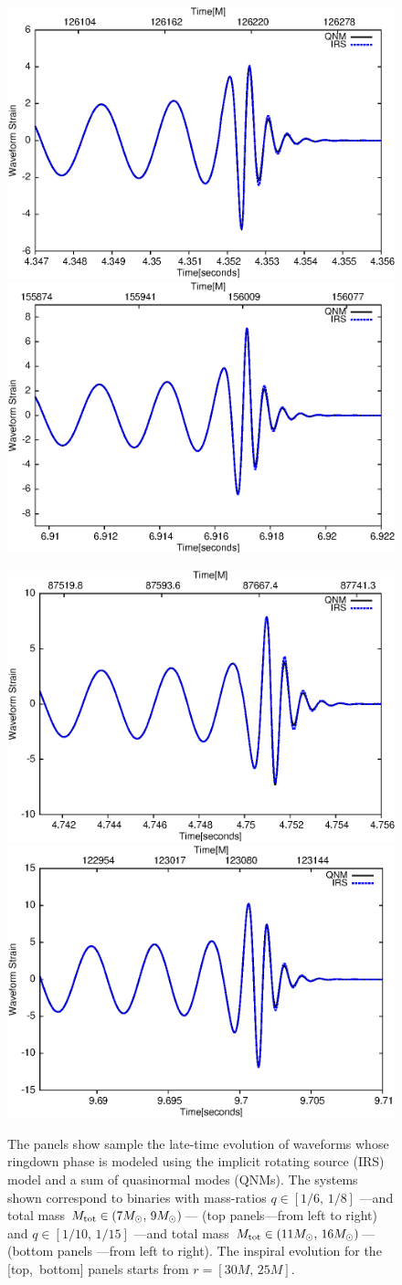 \documentclass[aps,prd,showpacs,amssymb,floatfix,nofootinbib,superscriptaddress]{revtex4-1}%
\begin{document}
\begin{figure}[ht]
\centerline{
\includegraphics[height=0.35\textwidth,  clip]{QNMvsIRSm1m6.eps}
\includegraphics[height=0.35\textwidth,  clip]{QNMvsIRSm1m8.eps}
}
\centerline{
\includegraphics[height=0.35\textwidth,  clip]{QNMvsIRSm1m10.eps}
\includegraphics[height=0.35\textwidth,  clip]{QNMvsIRSm1m15.eps}
}
\caption{The panels show sample the late-time evolution of waveforms whose ringdown phase is modeled using the implicit rotating source (IRS) model and a sum of quasinormal modes (QNMs). The systems shown correspond to binaries with mass-ratios \(q\in[1/6,\,1/8]\) ---and total mass  \(M_{{\rm{tot}}}\in( 7M_{\odot},\, 9M_{\odot}) \)--- (top panels---from left to right) and \(q\in[1/10,\, 1/15]\)  ---and total mass  \(M_{{\rm{tot}}}\in( 11M_{\odot},\, 16M_{\odot}) \)--- (bottom panels ---from left to right). The inspiral evolution for the [top,\, bottom] panels starts from  \(r=[30M,\, 25M]\). }
\label{QNMvsIRS}
\end{figure}
\end{document}
